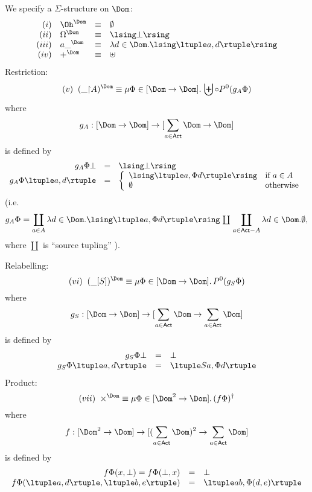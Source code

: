 \begin{definition} 
\label{sigd}
{\rm We specify a $\Sigma$-structure on $\Dom$:
\[ \begin{array}{rlcl}
(i) & \Oh^{\Dom} & \equiv & \emptyset \\
(ii) & \Omega^{\Dom} & \equiv & \lsing \bot \rsing \\
(iii) & {a\_}^{\Dom} & \equiv & \lambda d \in {\Dom}. \lsing \ltuple a, d \rtuple \rsing \\
(iv) & +^{\Dom} & \equiv & \uplus \\
\end{array} \]
Restriction:
\[ (v) \;\; (\_ {\restriction} A)^{\Dom}  \equiv  \mu \Phi \in [\Dom \rightarrow \Dom ] . \, \biguplus \circ P^{0} (g_{A} \Phi ) \]
where
\[ g_{A} : [ \Dom \rightarrow \Dom ] \rightarrow [ \sum_{a \in {\sf Act}} \Dom \rightarrow \Dom ] \]
is defined by
\[ \begin{array}{rcl}
g_{A} \Phi \bot & = & \lsing \bot \rsing \\
g_{A} \Phi \ltuple a, d \rtuple & = & \left\{ \begin{array}{ll} 
\lsing \ltuple a, \Phi d \rtuple \rsing & \mbox{if $a \in A$} \\
\emptyset & \mbox{otherwise}
\end{array}
\right. \\
\end{array} \]
(i.e. 
\[ g_{A} \Phi = {\coprod_{a \in A} \lambda d \in \Dom . \lsing \ltuple a, \Phi d \rtuple \rsing} \; {\textstyle \coprod} \; {\coprod_{a \in {\sf Act} - A} \lambda d \in \Dom . \emptyset } , \]
where $\coprod$ is ``source tupling'' \cite{ADJ85}).

\noindent Relabelling:
\[ (vi) \;\; (\_ [S])^{\Dom}  \equiv  \mu \Phi \in [\Dom \rightarrow \Dom ] . \,  P^{0} (g_{S} \Phi ) \]
where
\[ g_{S} : [ \Dom \rightarrow \Dom ] \rightarrow [ \sum_{a \in {\sf Act}} \Dom \rightarrow \sum_{a \in {\sf Act}} \Dom  ] \]
is defined by
\[ \begin{array}{rcl}
g_{S} \Phi \bot & = &  \bot  \\
g_{S} \Phi \ltuple a, d \rtuple & = & \ltuple Sa, \Phi d \rtuple
\end{array} \]
Product: 
\[ (vii) \;\; \times^{\Dom}  \equiv  \mu \Phi \in [\Dom^{2} \rightarrow \Dom ] . \,   (f \Phi )^{\dagger} \]
where
\[ f : [ \Dom^{2} \rightarrow \Dom ] \rightarrow [ ( \sum_{a \in {\sf Act}} \Dom )^{2} \rightarrow \sum_{a \in {\sf Act}} \Dom  ] \]
is defined by
\[ \begin{array}{rcl}
f \Phi (x, \bot ) = f \Phi (\bot , x)  & = &  \bot  \\
f \Phi (\ltuple a, d \rtuple  , \ltuple b, e \rtuple ) & = &  \ltuple ab, \Phi (d, e) \rtuple 
\end{array} \] }
\end{definition}

